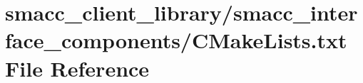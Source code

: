 \hypertarget{client__library_2smacc__interface__components_2CMakeLists_8txt}{}\section{smacc\+\_\+client\+\_\+library/smacc\+\_\+interface\+\_\+components/\+C\+Make\+Lists.txt File Reference}
\label{client__library_2smacc__interface__components_2CMakeLists_8txt}
